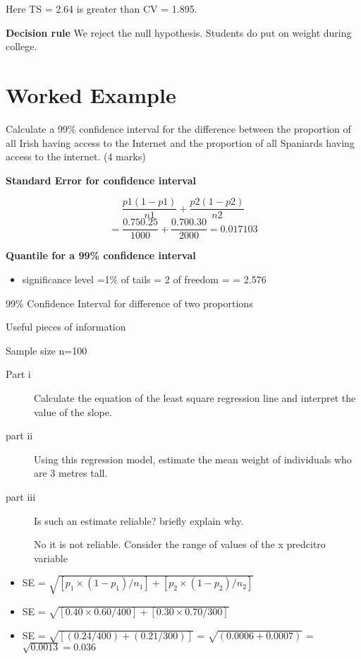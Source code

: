 Here TS = 2.64  is greater than CV = 1.895.

\noindent \textbf{Decision rule}
We reject the null hypothesis. Students do put on weight during college. 




\section{Worked Example}
Calculate a 99\% confidence interval for the difference between the proportion of all Irish having access to the
Internet and the proportion of all Spaniards having access to the internet.  (4 marks)



\noindent \textbf{Standard Error for confidence interval}

\[\frac{p1(1 -p1)}{n1}+ \frac{p2(1 -p2)}{n2}\]
\[=\frac{0.750.25}{1000}+ \frac{0.700.30}{2000}     =  0.017103\]

\noindent \textbf{Quantile for a 99\% confidence interval}
\begin{itemize}
\item significance level  =1\%
\itemnumber of tails = 2
\itemdegrees of freedom = 
\itemquantile = 2.576 
\end{itemize}



99\% Confidence Interval for difference of two proportions



Useful pieces of information


Sample size  n=100


\begin{description}
\item[Part i]
Calculate the equation of the least square regression line and interpret the value of the slope.

\item[part ii]

Using this regression model, estimate the mean weight of individuals who are 3 metres tall.
\item[part iii]

Is such an estimate reliable?  briefly explain why.

No it is not reliable. Consider the range of values of the x predcitro variable
\end{description}



\begin{itemize}
\item SE = $\sqrt{ [p_1 \times (1 - p_1) / n_1] + [p_2 \times (1 - p_2) / n_2] } $
\item SE = $\sqrt{ [0.40 \times 0.60 / 400] + [0.30 \times 0.70 / 300] } $
\item SE  = $\sqrt{[ (0.24 / 400) + (0.21 / 300) ]}$ = $\sqrt{(0.0006 + 0.0007)}$ = $\sqrt{0.0013} = 0.036$
\end{itemize}


